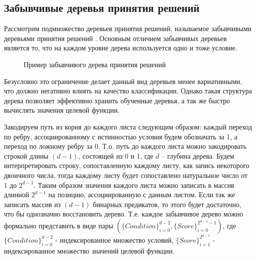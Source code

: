\documentclass[12pt,a4paper]{report}
\begin{document}
\subsection{Забывчивые деревья принятия решений}
Рассмотрим подмножество деревьев принятия решений, называемое забывчивыми деревьями принятия решений \cite{Ot}.
Основным отличием забывчивых деревьев является то, что 
на каждом уровне дерева используется одно и тоже условие. 

\begin{figure}[H]
\center{\texttt{[image: ot]}}
\caption{Пример забывчивого дерева принятия решений}
\label{ris:ot}
\end{figure}

Безусловно это ограничение делает данный вид деревьев менее вариативными, что должно негативно влиять на качество классификации. Однако такая структура дерева позволяет эффективно хранить обученные деревья, а так же быстро вычислять значения целевой функции.

Закодируем путь из корня до каждого листа следующим образом: каждый переход по ребру, ассоциированному с истинностью условия будем обозначать за 1, а переход по ложному ребру за 0. Т.о. путь до каждого листа можно закодировать строкой длины $(d-1)$, состоящей из 0 и 1, где $d$ -- глубина дерева. Будем интерпретировать строку, сопоставленную каждому листу, как запись некоторого двоичного числа, тогда каждому листу будет сопоставлено натуральное число от 1 до $2^{d-1}$.
Таким образом значения каждого листа можно записать в массив длинной $2^{d-1}$ на позицию, ассоциированную с данным листом. Если так же записать массив из $(d-1)$ бинарных предикатов, то этого будет достаточно, что бы однозначно восстановить дерево.
Т.е. каждое забывчивое дерево можно формально представить в виде пары $(\{Condition\}_{i=0}^{d - 2}, \{Score\}_{i=0}^{2^{d - 1} - 1})$, где $\{Condition\}_{i=0}^{d - 2}$ - индексированное множество условий, $\{Score\}_{i=1}^{2^{d - 1}}$ - индексированное множество значений целевой функции.
\end{document}
